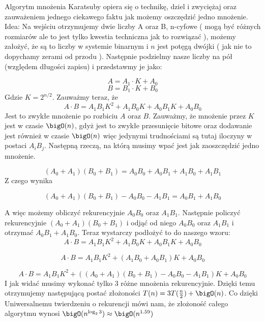 Algorytm mnożenia Karatsuby opiera się o technikę, dziel i zwyciężaj oraz zauważeniem jednego ciekawego faktu jak możemy oszczędzić jedno mnożenie.
\newline \newline
Idea:
\newline
Na wejściu otrzymujemy dwie liczby A oraz B, n-cyfowe ( mogą być różnych rozmiarów ale to jest tylko kwestia techniczna jak to rozwiązać ), możemy założyć, że są to liczby w systemie binarnym i $n$ jest potęgą dwójki ( jak nie to dopychamy zerami od przodu ).
\newline \newline
Następnie podzielmy nasze liczby na pół (względem długości zapisu) i przedstawmy je jako:

$$A = A_1 \cdot K + A_0 $$
$$B = B_1 \cdot K + B_0 $$
Gdzie $K = 2^{n/2}$.
\newline \newline
Zauważmy teraz, że $$A \cdot B = A_1  B_1  K^2 + A_1  B_0  K + A_0  B_1  K + A_0  B_0$$
Jest to zwykłe mnożenie po rozbiciu $A$ oraz $B$. Zauważmy, że mnożenie przez $K$ jest w czasie $\bigO(n)$, gdyż jest to zwykłe przesunięcie bitowe oraz dodawanie jest również w czasie $\bigO(n)$ więc jedynymi trudnościami są tutaj iloczyny w postaci $A_i B_j$.
\newline \newline
Następną rzeczą, na którą musimy wpać jest jak zaoszczędzić jedno mnożenie.

$$(A_0 + A_1)(B_0 + B_1) = A_0 B_0 + A_0 B_1 + A_1 B_0 + A_1 B_1$$
Z czego wynika

$$(A_0 + A_1)(B_0 + B_1) - A_0 B_0 - A_1 B_1 = A_0 B_1 + A_1 B_0$$

A więc możemy obliczyć rekurencyjnie $A_0 B_0$ oraz $A_1 B_1$. Następnie policzyć rekurencyjnie $(A_0 + A_1)(B_0 + B_1)$ i odjąć od niego $A_0 B_0$ oraz $A_1 B_1$ i otrzymać $A_0 B_1 + A_1 B_0$. Teraz wystarczy podłożyć to do naszego wzoru:
$$A \cdot B = A_1  B_1  K^2 + A_1  B_0  K + A_0  B_1  K + A_0  B_0$$

$$A \cdot B = A_1  B_1  K^2 + (A_1  B_0  + A_0  B_1 ) K + A_0  B_0$$

$$A \cdot B = A_1  B_1  K^2 + ((A_0 + A_1)(B_0 + B_1) - A_0 B_0 - A_1 B_1) K + A_0  B_0$$
I jak widać musimy wykonać tylko 3 różne mnożenia rekurencyjnie.
\newline \newline
Dzięki temu otrzymujemy następującą postać złożoności $T(n) = 3T(\frac{n}{2}) + \bigO(n)$. Co dzięki Uniwersalnemu twierdzeniu o rekurencji mówi nam, że złożoność całego algorytmu wynosi $\bigO(n^{\log_2 3}) \approx \bigO(n^{1.59})$
